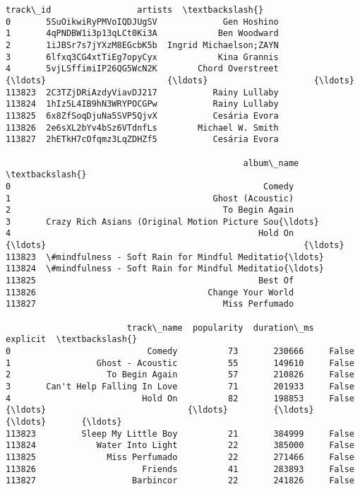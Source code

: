 \documentclass[11pt]{article}
\makeatletter
\newcommand{\boxspacing}{\kern\kvtcb@left@rule\kern\kvtcb@boxsep}
\newcommand{\prompt}[4]{
        {\ttfamily\llap{{\color{#2}[#3]:\hspace{3pt}#4}}\vspace{-\baselineskip}}
    }
\makeatother
\begin{document}
            \begin{tcolorbox}[breakable, size=fbox, boxrule=.5pt, pad at break*=1mm, opacityfill=0]
\prompt{Out}{outcolor}{66}{\boxspacing}
\begin{Verbatim}[commandchars=\\\{\}]
                      track\_id                 artists  \textbackslash{}
0       5SuOikwiRyPMVoIQDJUgSV             Gen Hoshino
1       4qPNDBW1i3p13qLCt0Ki3A            Ben Woodward
2       1iJBSr7s7jYXzM8EGcbK5b  Ingrid Michaelson;ZAYN
3       6lfxq3CG4xtTiEg7opyCyx            Kina Grannis
4       5vjLSffimiIP26QG5WcN2K        Chord Overstreet
{\ldots}                        {\ldots}                     {\ldots}
113823  2C3TZjDRiAzdyViavDJ217           Rainy Lullaby
113824  1hIz5L4IB9hN3WRYPOCGPw           Rainy Lullaby
113825  6x8ZfSoqDjuNa5SVP5QjvX           Cesária Evora
113826  2e6sXL2bYv4bSz6VTdnfLs        Michael W. Smith
113827  2hETkH7cOfqmz3LqZDHZf5           Cesária Evora

                                               album\_name  \textbackslash{}
0                                                  Comedy
1                                        Ghost (Acoustic)
2                                          To Begin Again
3       Crazy Rich Asians (Original Motion Picture Sou{\ldots}
4                                                 Hold On
{\ldots}                                                   {\ldots}
113823  \#mindfulness - Soft Rain for Mindful Meditatio{\ldots}
113824  \#mindfulness - Soft Rain for Mindful Meditatio{\ldots}
113825                                            Best Of
113826                                  Change Your World
113827                                     Miss Perfumado

                        track\_name  popularity  duration\_ms  explicit  \textbackslash{}
0                           Comedy          73       230666     False
1                 Ghost - Acoustic          55       149610     False
2                   To Begin Again          57       210826     False
3       Can't Help Falling In Love          71       201933     False
4                          Hold On          82       198853     False
{\ldots}                            {\ldots}         {\ldots}          {\ldots}       {\ldots}
113823         Sleep My Little Boy          21       384999     False
113824            Water Into Light          22       385000     False
113825              Miss Perfumado          22       271466     False
113826                     Friends          41       283893     False
113827                   Barbincor          22       241826     False


\end{Verbatim}
\end{tcolorbox}
\end{document}
